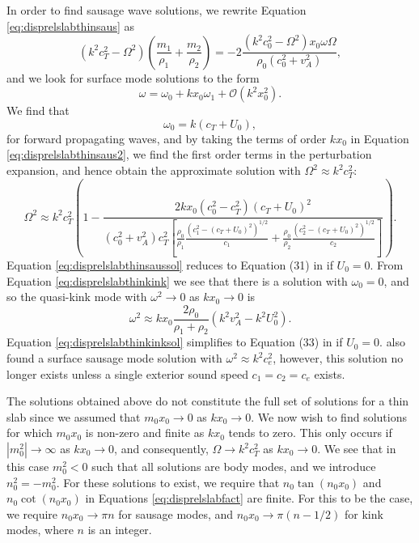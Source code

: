 In order to find sausage wave solutions, we rewrite Equation \eqref{eq:disprelslabthinsaus} as
%
\begin{equation}
\label{eq:disprelslabthinsaus2}
( k^2 c_T^2 - \Omega^2) \left( \frac{m_1}{\rho_1} + \frac{m_2}{\rho_2} \right)
= - 2 \frac{(k^2 c_0^2 - \Omega^2) x_0 \omega \Omega}{\rho_0 (c_0^2 + v_A^2)},
\end{equation}
%
and we look for surface mode solutions to the form
%
\begin{equation}
\label{eq:omegapert}
\omega = \omega_{0} + k x_0 \omega_{1} + \mathcal{O}(k^2 x_0^2).
\end{equation}
%
We find that
%
\begin{equation}
\label{eq:omega00}
\omega_{0} = k(c_T + U_0),
\end{equation}
%
for forward propagating waves, and by taking the terms of order $k x_0$ in Equation \eqref{eq:disprelslabthinsaus2}, we find the first order terms in the perturbation expansion, and hence obtain the approximate solution with $\Omega^2 \approx k^2 c_T^2$:
%
\begin{equation}
\label{eq:disprelslabthinsaussol}
\Omega^2
\approx k^2 c_T^2 \left(1
- \frac{2 k x_0 (c_0^2 - c_T^2) (c_T + U_0)^2}
{(c_0^2 + v_A^2) c_T^2
\left[ \frac{\rho_0}{\rho_1} \frac{(c_1^2 - (c_T + U_0)^2)^{1/2}}{c_1}
+ \frac{\rho_0}{\rho_2} \frac{(c_2^2 - (c_T + U_0)^2)^{1/2}}{c_2}
\right]} \right).
\end{equation}
%
Equation \eqref{eq:disprelslabthinsaussol} reduces to Equation (31) in \cite{Allcock2017} if $U_0 = 0$.
From Equation \eqref{eq:disprelslabthinkink} we see that there is a solution with $\omega_{0} = 0$, and so the quasi-kink mode with $\omega^2 \to 0$ as $k x_0 \to 0$ is
\begin{equation}
\label{eq:disprelslabthinkinksol}
\omega^2 \approx k x_0 \frac{2 \rho_0}{\rho_1 + \rho_2} (k^2 v_A^2 - k^2 U_0^2). 
\end{equation}
Equation \eqref{eq:disprelslabthinkinksol} simplifies to Equation (33) in \cite{Allcock2017} if $U_0 = 0$.
\cite{Roberts1981b} also found a surface sausage mode solution with $\omega^2 \approx k^2 c_e^2$, however, this solution no longer exists unless a single exterior sound speed $c_1 = c_2 = c_e$ exists.

The solutions obtained above do not constitute the full set of solutions for a thin slab since we assumed that $m_0 x_0 \to 0$ as $k x_0 \to 0$.
We now wish to find solutions for which $m_0 x_0$ is non-zero and finite as $k x_0$ tends to zero.
This only occurs if $|m_0^2| \to \infty$ as $k x_0 \to 0$, and consequently, $\Omega \to k^2 c_T^2$ as $k x_0 \to 0$.
We see that in this case $m_0^2 < 0$ such that all solutions are body modes, and we introduce $n_0^2 = - m_0^2$.
For these solutions to exist, we require that $n_0 \tan(n_0 x_0)$ and $n_0 \cot(n_0 x_0)$ in Equations \eqref{eq:disprelslabfact} are finite.
For this to be the case, we require $n_0 x_0 \to \pi n$ for sausage modes, and $n_0 x_0 \to \pi ( n - 1/2)$ for kink modes, where $n$ is an integer.


